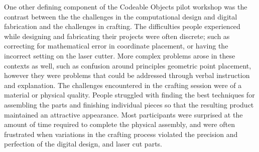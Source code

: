 One other defining component of the Codeable Objects pilot workshop was the contrast between the the challenges in the computational design and digital fabrication and the challenges in crafting. The difficulties people experienced while designing and fabricating their projects were often discrete;  such as correcting for mathematical error in coordinate placement, or having the incorrect setting on the laser cutter. More complex problems arose in these contexts as well, such as confusion around principles geometric point placement, however they were problems that could be addressed through verbal instruction and explanation. The challenges encountered in the crafting session were of a material or physical quality.  People struggled with finding the best techniques for assembling the parts and finishing individual pieces so that the resulting product maintained an attractive appearance. Most participants were surprised at the amount of time required to complete the physical assembly, and were often frustrated when variations in the crafting process violated the precision and perfection of the digital design, and laser cut parts. 

